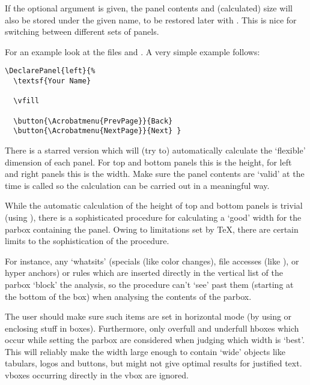 \documentclass[12pt]{scrartcl}
\let\newslide=\relax
\begin{document}
  If the optional argument  is given, the panel contents and
  (calculated) size will also be stored under the given name, to be restored
  later with . This is nice for switching between
  different sets of panels.

  \newslide

  For an example look at the files  and .
  A very simple example follows:

  \begin{verbatim}
\DeclarePanel{left}{%
  \textsf{Your Name}

  \vfill

  \button{\Acrobatmenu{PrevPage}}{Back}
  \button{\Acrobatmenu{NextPage}}{Next} }
\end{verbatim}

  \newslide

  There is a starred version which will (try to) automatically calculate the
   `flexible' dimension of each panel. For top and
  bottom panels this is the height, for left and right panels this is the width.
  Make sure the panel contents are `valid' at the time 
  is called so the calculation can be carried out in a meaningful way.

  While the automatic calculation of the height of top and bottom panels is
  trivial (using ), there is a sophisticated procedure
  for calculating a `good' width for the parbox containing the panel. Owing to
  limitations set by TeX, there are certain limits to the sophistication of the
  procedure.

  \newslide

  For instance, any `whatsits' (specials (like color changes), file
  accesses (like ), or hyper anchors)
  or rules which are inserted directly in the vertical list of the parbox
  `block' the analysis, so the procedure can't `see' past them (starting at the
  bottom of the box) when analysing the contents of the parbox.

  The user should make sure such items are set in horizontal mode (by using
   or enclosing stuff in boxes). Furthermore, only
  overfull and underfull hboxes which occur while setting the parbox are
  considered when judging which width is `best'. This will reliably make the
  width large enough to contain `wide' objects like tabulars, logos and buttons,
  but might not give optimal results for justified text.  vboxes occurring
  directly in the vbox are ignored.
\end{document}
